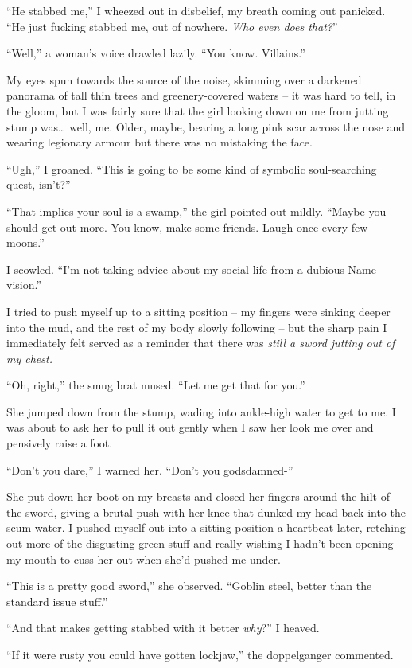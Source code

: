 \documentclass[12pt, openany]{book}
\begin{document}
“He stabbed me,” I wheezed out in disbelief, my breath coming out panicked. “He just fucking stabbed me, out of nowhere. \textit{Who even does that?}”

“Well,” a woman’s voice drawled lazily. “You know. Villains.”

My eyes spun towards the source of the noise, skimming over a darkened panorama of tall thin trees and greenery-covered waters – it was hard to tell, in the gloom, but I was fairly sure that the girl looking down on me from jutting stump was… well, me. Older, maybe, bearing a long pink scar across the nose and wearing legionary armour but there was no mistaking the face.

“Ugh,” I groaned. “This is going to be some kind of symbolic soul-searching quest, isn’t?”

“That implies your soul is a swamp,” the girl pointed out mildly. “Maybe you should get out more. You know, make some friends. Laugh once every few moons.”

I scowled. “I’m not taking advice about my social life from a dubious Name vision.”

I tried to push myself up to a sitting position – my fingers were sinking deeper into the mud, and the rest of my body slowly following – but the sharp pain I immediately felt served as a reminder that there was \textit{still a sword jutting out of my chest.}

“Oh, right,” the smug brat mused. “Let me get that for you.”

She jumped down from the stump, wading into ankle-high water to get to me. I was about to ask her to pull it out gently when I saw her look me over and pensively raise a foot.

“Don’t you dare,” I warned her. “Don’t you godsdamned-”

She put down her boot on my breasts and closed her fingers around the hilt of the sword, giving a brutal push with her knee that dunked my head back into the scum water. I pushed myself out into a sitting position a heartbeat later, retching out more of the disgusting green stuff and really wishing I hadn’t been opening my mouth to cuss her out when she’d pushed me under.

“This is a pretty good sword,” she observed. “Goblin steel, better than the standard issue stuff.”

“And that makes getting stabbed with it better \textit{why}?” I heaved.

“If it were rusty you could have gotten lockjaw,” the doppelganger commented.
\end{document}
